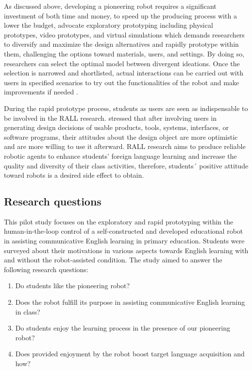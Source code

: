 \documentclass[english]{textolivre}
\begin{document}
As discussed above, developing a pioneering robot requires a significant investment of both time and money, to speed up the producing process with a lower the budget, \textcite{zamfirescu-pereira_fake_2021} advocate exploratory prototyping including physical prototypes, video prototypes, and virtual simulations which demands researchers to diversify and maximize the design alternatives and rapidly prototype within them, challenging the options toward materials, users, and settings. By doing so, researchers can select the optimal model between divergent ideations. Once the selection is narrowed and shortlisted, actual interactions can be carried out with users in specified scenarios to try out the functionalities of the robot and make improvements if needed \cite{zamfirescu-pereira_fake_2021}.

During the rapid prototype process, students as users are seen as indispensable to be involved in the RALL research. \textcite{reich-stiebert_exploring_2020} stressed that after involving users in generating design decisions of usable products, tools, systems, interfaces, or software programs, their attitudes about the design object are more optimistic and are more willing to use it afterward. RALL research aims to produce reliable robotic agents to enhance students’ foreign language learning and increase the quality and diversity of their class activities, therefore, students´ positive attitude toward robots is a desired side effect to obtain.

\subsection{Research questions}\label{sec-conduta}
This pilot study focuses on the exploratory and rapid prototyping within the human-in-the-loop control of a self-constructed and developed educational robot in assisting communicative English learning in primary education. Students were surveyed about their motivations in various aspects towards English learning with and without the robot-assisted condition. The study aimed to answer the following research questions:

\begin{enumerate}
    \item Do students like the pioneering robot?
    \item Does the robot fulfill its purpose in assisting communicative English learning in class?
    \item Do students enjoy the learning process in the presence of our pioneering robot?
    \item Does provided enjoyment by the robot boost target language acquisition and how? 
\end{enumerate}
\end{document}
